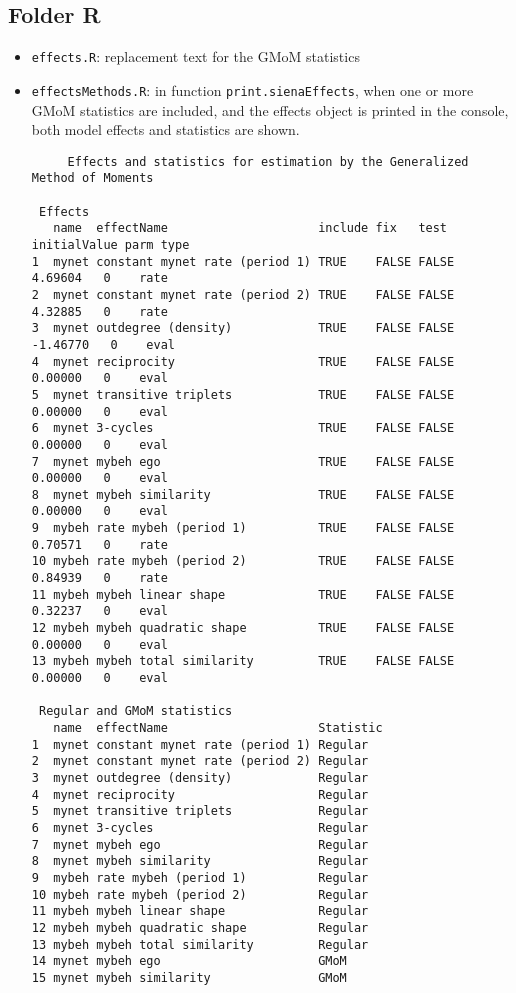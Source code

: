 \documentclass[a4paper,11pt]{article}
\begin{document}
\subsection*{Folder R}
\begin{itemize}
	\item \texttt{effects.R}: replacement text for the GMoM statistics
	\smallskip
	\item \texttt{effectsMethods.R}: in function \texttt{print.sienaEffects}, when one or more GMoM statistics are included, and the effects object is printed in the console, both model effects and statistics are shown.
		{\footnotesize
	\begin{verbatim}
	 Effects and statistics for estimation by the Generalized Method of Moments

 Effects
   name  effectName                     include fix   test  initialValue parm type
1  mynet constant mynet rate (period 1) TRUE    FALSE FALSE    4.69604   0    rate
2  mynet constant mynet rate (period 2) TRUE    FALSE FALSE    4.32885   0    rate
3  mynet outdegree (density)            TRUE    FALSE FALSE   -1.46770   0    eval
4  mynet reciprocity                    TRUE    FALSE FALSE    0.00000   0    eval
5  mynet transitive triplets            TRUE    FALSE FALSE    0.00000   0    eval
6  mynet 3-cycles                       TRUE    FALSE FALSE    0.00000   0    eval
7  mynet mybeh ego                      TRUE    FALSE FALSE    0.00000   0    eval
8  mynet mybeh similarity               TRUE    FALSE FALSE    0.00000   0    eval
9  mybeh rate mybeh (period 1)          TRUE    FALSE FALSE    0.70571   0    rate
10 mybeh rate mybeh (period 2)          TRUE    FALSE FALSE    0.84939   0    rate
11 mybeh mybeh linear shape             TRUE    FALSE FALSE    0.32237   0    eval
12 mybeh mybeh quadratic shape          TRUE    FALSE FALSE    0.00000   0    eval
13 mybeh mybeh total similarity         TRUE    FALSE FALSE    0.00000   0    eval

 Regular and GMoM statistics
   name  effectName                     Statistic
1  mynet constant mynet rate (period 1) Regular
2  mynet constant mynet rate (period 2) Regular
3  mynet outdegree (density)            Regular
4  mynet reciprocity                    Regular
5  mynet transitive triplets            Regular
6  mynet 3-cycles                       Regular
7  mynet mybeh ego                      Regular
8  mynet mybeh similarity               Regular
9  mybeh rate mybeh (period 1)          Regular
10 mybeh rate mybeh (period 2)          Regular
11 mybeh mybeh linear shape             Regular
12 mybeh mybeh quadratic shape          Regular
13 mybeh mybeh total similarity         Regular
14 mynet mybeh ego                      GMoM
15 mynet mybeh similarity               GMoM
	\end{verbatim}}


\end{itemize}
\end{document}

